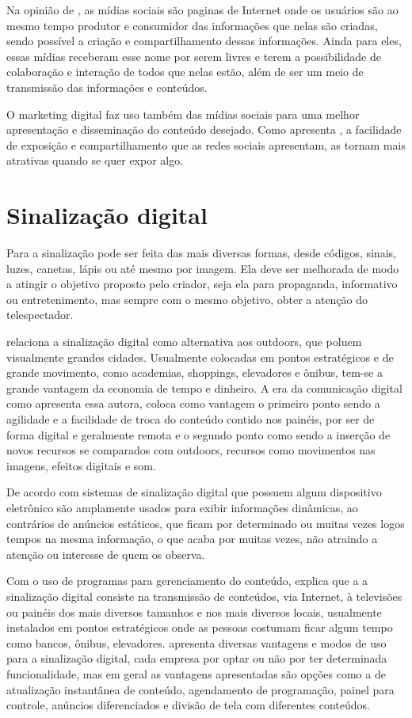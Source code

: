Na opinião de \cite{torres2000}, as mídias sociais são paginas de Internet onde os usuários são ao mesmo tempo produtor e consumidor das informações que nelas são criadas, sendo possível a criação e compartilhamento dessas informações. Ainda para eles, essas mídias receberam esse nome por serem livres e terem a possibilidade de
colaboração e interação de todos que nelas estão, além de ser um meio de transmissão das informações e conteúdos.

O marketing digital faz uso também das mídias sociais para uma melhor apresentação e disseminação do conteúdo desejado. Como apresenta \cite{torres2000}, a facilidade de exposição e compartilhamento que as redes sociais apresentam, as tornam mais atrativas quando se quer expor algo.

\section{Sinalização digital}
Para \cite{munari2006} a sinalização pode ser feita das mais diversas formas, desde códigos, sinais, luzes, canetas, lápis ou até mesmo por imagem. Ela deve ser melhorada de modo a atingir o objetivo proposto pelo criador, seja ela para propaganda, informativo ou entretenimento, mas sempre com o mesmo objetivo, obter a atenção do telespectador.

\cite[p.11]{cintra2010} relaciona a sinalização digital como alternativa aos outdoors,
que poluem visualmente grandes cidades. Usualmente colocadas em pontos estratégicos e de grande movimento, como academias, shoppings, elevadores e ônibus, tem-se a grande vantagem da economia de tempo e dinheiro. A era da comunicação digital como apresenta essa autora, coloca como vantagem o primeiro ponto sendo a agilidade e a
facilidade de troca do conteúdo contido nos painéis, por ser de forma digital e geralmente remota e o segundo ponto como sendo a inserção de novos recursos se comparados com outdoors, recursos como movimentos nas imagens, efeitos digitais e som.

De acordo com \cite{mishima2016} sistemas de sinalização
digital que possuem algum dispositivo eletrônico são amplamente usados para exibir informações dinâmicas, ao contrários de anúncios estáticos, que ficam por determinado ou muitas vezes logos tempos na mesma informação, o que acaba por muitas vezes, não atraindo a atenção ou interesse de quem os observa.

Com o uso de programas para gerenciamento do conteúdo, \cite[p.31]{machado2010} explica que a a sinalização digital consiste na transmissão de conteúdos, via Internet, à televisões ou painéis dos mais diversos tamanhos e nos mais diversos locais, usualmente instalados em pontos estratégicos onde as pessoas costumam ficar algum tempo como bancos, ônibus, elevadores.
\cite[p.36]{machado2010} apresenta diversas vantagens e modos de uso para a sinalização digital, cada empresa por optar ou não por ter determinada funcionalidade, mas em geral as vantagens apresentadas são opções como a de atualização instantânea de conteúdo, agendamento de programação, painel para controle, anúncios diferenciados e divisão de tela com diferentes conteúdos.

